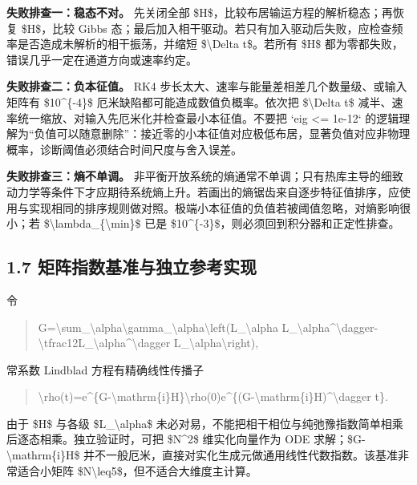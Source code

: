 \documentclass[UTF8,openany,11pt,fontset=fandol]{ctexbook}
\begin{document}
\textbf{失败排查一：稳态不对。} 先关闭全部
\$H\$，比较布居输运方程的解析稳态；再恢复 \$H\$，比较 Gibbs
态；最后加入相干驱动。若只有加入驱动后失败，应检查频率是否造成未解析的相干振荡，并缩短
\$\textbackslash Delta t\$。若所有 \$H\$
都为零都失败，错误几乎一定在通道方向或速率约定。

\textbf{失败排查二：负本征值。} RK4
步长太大、速率与能量差相差几个数量级、或输入矩阵有 \$10\^{}\{-4\}\$
厄米缺陷都可能造成数值负概率。依次把 \$\textbackslash Delta t\$
减半、速率统一缩放、对输入先厄米化并检查最小本征值。不要把 `eig
\textless= 1e-12`
的逻辑理解为``负值可以随意删除''：接近零的小本征值对应极低布居，显著负值对应非物理概率，诊断阈值必须结合时间尺度与舍入误差。

\textbf{失败排查三：熵不单调。}
非平衡开放系统的熵通常不单调；只有热库主导的细致动力学等条件下才应期待系统熵上升。若画出的熵锯齿来自逐步特征值排序，应使用与实现相同的排序规则做对照。极端小本征值的负值若被阈值忽略，对熵影响很小；若
\$\textbackslash lambda\_\{\textbackslash min\}\$ 已是
\$10\^{}\{-3\}\$，则必须回到积分器和正定性排查。

\subsection{\texorpdfstring{\textbf{1.7
矩阵指数基准与独立参考实现}}{1.7 矩阵指数基准与独立参考实现}}\label{ux77e9ux9635ux6307ux6570ux57faux51c6ux4e0eux72ecux7acbux53c2ux8003ux5b9eux73b0}

令

\begin{quote}
G=\textbackslash sum\_\textbackslash alpha\textbackslash gamma\_\textbackslash alpha\textbackslash left(L\_\textbackslash alpha
L\_\textbackslash alpha\^{}\textbackslash dagger-\textbackslash tfrac12L\_\textbackslash alpha\^{}\textbackslash dagger
L\_\textbackslash alpha\textbackslash right),
\end{quote}

常系数 Lindblad 方程有精确线性传播子

\begin{quote}
\textbackslash rho(t)=e\^{}\{G-\textbackslash mathrm\{i\}H\}\textbackslash rho(0)e\^{}\{(G-\textbackslash mathrm\{i\}H)\^{}\textbackslash dagger
t\}.
\end{quote}

由于 \$H\$ 与各级 \$L\_\textbackslash alpha\$
未必对易，不能把相干相位与纯弛豫指数简单相乘后逐态相乘。独立验证时，可把
\$N\^{}2\$ 维实化向量作为 ODE 求解；\$G-\textbackslash mathrm\{i\}H\$
并不一般厄米，直接对实化生成元做通用线性代数指数。该基准非常适合小矩阵
\$N\textbackslash leq5\$，但不适合大维度主计算。
\end{document}
